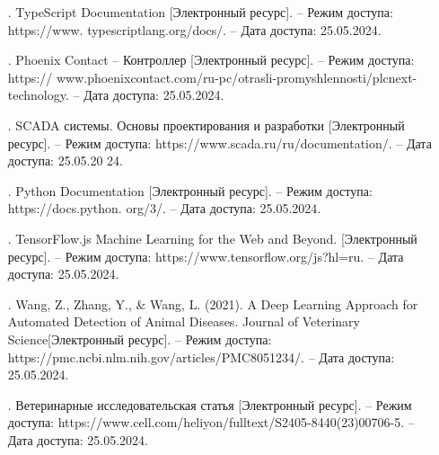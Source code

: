 {\begin{itemize}[leftmargin=2.15cm, labelwidth=0.65cm, labelsep=0.0cm]
\item[\theimagecntr.] TypeScript Documentation [Электронный ресурс]. – Режим доступа: https://www. typescriptlang.org/docs/. – Дата доступа: 25.05.2024.
\addtocounter{imagecntr}{1}

\item[\theimagecntr.] Phoenix Contact – Контроллер [Электронный ресурс]. – Режим доступа: https:// www.phoenixcontact.com/ru-pc/otrasli-promyshlennosti/plcnext-technology. – Дата доступа: 25.05.2024.
\addtocounter{imagecntr}{1}

\item[\theimagecntr.] SCADA системы. Основы проектирования и разработки [Электронный ресурс]. – Режим доступа: https://www.scada.ru/ru/documentation/. – Дата доступа: 25.05.20 24.
\addtocounter{imagecntr}{1}

\item[\theimagecntr.] Python Documentation [Электронный ресурс]. – Режим доступа: https://docs.python. org/3/. – Дата доступа: 25.05.2024.
\addtocounter{imagecntr}{1}

\item[\theimagecntr.] TensorFlow.js Machine Learning for the Web and Beyond. [Электронный ресурс]. – Режим доступа: https://www.tensorflow.org/js?hl=ru. – Дата доступа: 25.05.2024.
\addtocounter{imagecntr}{1}

\item[\theimagecntr.] Wang, Z., Zhang, Y., \& Wang, L. (2021). A Deep Learning Approach for Automated Detection of Animal Diseases. Journal of Veterinary Science[Электронный ресурс]. – Режим доступа: https://pmc.ncbi.nlm.nih.gov/articles/PMC8051234/. – Дата доступа: 25.05.2024.
\addtocounter{imagecntr}{1}

\item[\theimagecntr.] Ветеринарные исследовательская статья [Электронный ресурс]. – Режим доступа: https://www.cell.com/heliyon/fulltext/S2405-8440(23)00706-5. – Дата доступа: 25.05.2024.
\addtocounter{imagecntr}{1}

\end{itemize}

}
